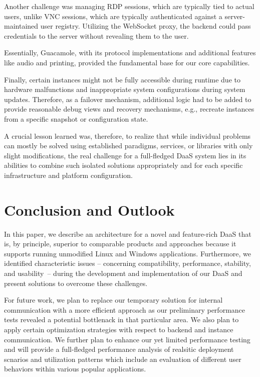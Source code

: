 \documentclass[runningheads]{llncs}
\begin{document}
Another challenge was managing RDP sessions, which are typically tied to actual users,
unlike VNC sessions, which are typically authenticated against
a server-maintained user registry.
Utilizing the WebSocket proxy, the backend could pass credentials
to the server without revealing them to the user.

Essentially, Guacamole, with its protocol implementations and additional features like audio and printing,
provided the fundamental base for our core capabilities.

Finally, certain instances might not be fully accessible during runtime
due to hardware malfunctions and inappropriate system configurations during system updates.
Therefore, as a failover mechanism, additional logic had to be added
to provide reasonable debug views and recovery mechanisms,
e.g., recreate instances from a specific snapshot or configuration state.

A crucial lesson learned was, therefore, to realize that
while individual problems can mostly be solved
using established paradigms, services, or libraries with only slight modifications,
the real challenge for a full-fledged DaaS system lies in its abilities
to combine such isolated solutions appropriately
and for each specific infrastructure and platform configuration.

\section{Conclusion and Outlook}
\label{sec:Conclusions}

In this paper, we describe an architecture for a novel
and feature-rich DaaS that is, by principle,
superior to comparable products and approaches
because it supports running unmodified Linux and Windows applications.
Furthermore, we identified characteristic issues
-- concerning compatibility, performance, stability, and usability --
during the development and implementation of our DaaS
and present solutions to overcome these challenges.

For future work,
we plan to replace our temporary solution for internal communication
with a more efficient approach as our preliminary performance tests revealed
a potential bottlenack in that particular area.
We also plan to apply certain optimization strategies
with respect to backend and instance communication.
We further plan to enhance our yet limited performance testing
and will provide a full-fledged performance analysis
of realsitic deployment scnarios and utilization patterns
which include an evaluation of different user behaviors
within various popular applications.
\end{document}
